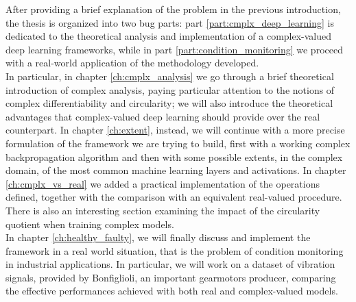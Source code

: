 \documentclass[../main.tex]{subfiles}
\begin{document}
After providing a brief explanation of the problem in the previous introduction, the thesis is organized into two bug parts: part \ref{part:cmplx_deep_learning} is dedicated to the theoretical analysis and implementation of a complex-valued deep learning frameworks, while in part \ref{part:condition_monitoring} we proceed with a real-world application of the methodology developed.\\
In particular, in chapter \ref{ch:cmplx_analysis} we go through a brief theoretical introduction of complex analysis, paying particular attention to the notions of complex differentiability and circularity; we will also introduce the theoretical advantages that complex-valued deep learning should provide over the real counterpart. In chapter \ref{ch:extent}, instead, we will continue with a more precise formulation of the framework we are trying to build, first with a working complex backpropagation algorithm and then with some possible extents, in the complex domain, of the most common machine learning layers and activations. In chapter \ref{ch:cmplx_vs_real} we added a practical implementation of the operations defined, together with the comparison with an equivalent real-valued procedure. There is also an interesting section examining the impact of the circularity quotient when training complex models.\\
In chapter \ref{ch:healthy_faulty}, we will finally discuss and implement the framework in a real world situation, that is the problem of condition monitoring in industrial applications. In particular, we will work on a dataset of vibration signals, provided by Bonfiglioli, an  important gearmotors producer, comparing the effective performances achieved with both real and complex-valued models. 
\end{document}

